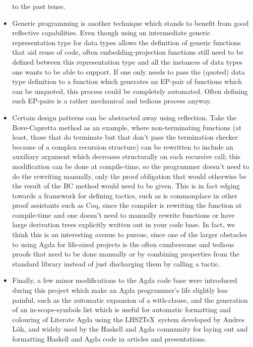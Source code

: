 \documentclass[a4paper]{article}
\begin{document}
\begin{itemize}
to the past tense.
  \item Generic programming is another technique which stands to
benefit from good reflective capabilities. Even though using an
intermediate generic representation type for data types allows the
definition of generic functions that aid reuse of code, often
embedding-projection functions still need to be defined between this
representation type and all the instances of data types one wants to be
able to support. If one only needs to pass the
(quoted) data type definition to a function which generates an EP-pair
of functions which can be unquoted, this process could be completely
automated. Often defining such EP-pairs is a rather mechanical and
tedious process anyway.
  \item Certain design patterns can be abstracted away using
reflection. Take the Bove-Capretta method as an example, where
non-terminating functions (at least, those that do terminate but that
don't pass the termination checker because of a complex recursion
structure) can be rewritten to include an auxiliary argument which
decreases structurally on each recursive call; this modification can be done at compile-time, so the programmer doesn't
need to do the rewriting manually, only the proof obligation that
would otherwise be
the result of the BC method would need to be given.  This is in fact
edging towards a framework for defining tactics, such as is
commonplace in other proof assistants such as Coq, since the
compiler is rewriting the function at compile-time and one doesn't
need to manually rewrite functions or have large derivation trees
explicitly written out in your code base.  In fact, we think this is
an interesting avenue to pursue, since one of the larger obstacles to
using Agda for life-sized projects is the often cumbersome and tedious
proofs that need to be done manually or by combining properties from
the standard library instead of just discharging them by calling a
tactic.
  \item Finally, a few minor modifications to the Agda code base were
introduced during this project which make an Agda programmer's life
slightly less painful, such as the automatic expansion of a
with-clause, and the generation of an in-scope-symbols list which is
useful for automatic formatting and colouring of Literate Agda using
the LHS2\TeX\ system developed by Andres L\"oh, and widely used by the
Haskell and Agda community for laying out and formatting Haskell and
Agda code in articles and presentations.
\end{itemize}




{}

\end{document}
